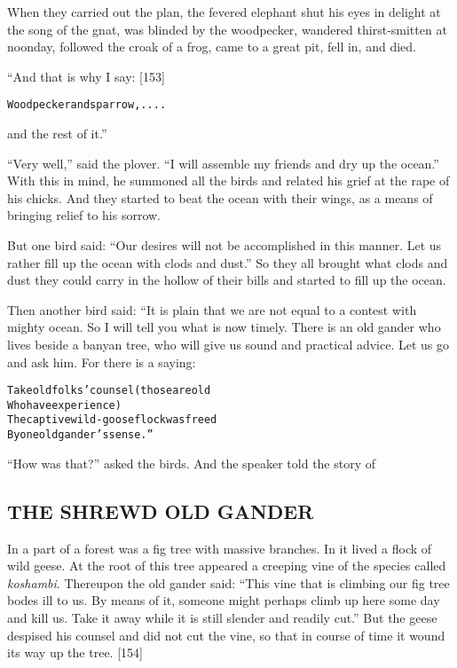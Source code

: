 \documentclass{article}
\renewenvironment{verbatim}{\begin{alltt}\normalfont\begin{centering}}{\end{centering}\end{alltt}}
\begin{document}
When they carried out the plan, the fevered elephant shut his eyes
in delight at the song of the gnat, was blinded by the woodpecker,
wandered thirst-smitten at noonday, followed the croak of a frog,
came to a great pit, fell in, and died.

“And that is why I say: [153]

\begin{verbatim}
Woodpecker and sparrow, . . . .
\end{verbatim}
and the rest of it.”

``Very well,'' said the plover.
``I will assemble my friends and dry up the ocean.'' With this in
mind, he summoned all the birds and related his grief at the rape
of his chicks. And they started to beat the ocean with their wings,
as a means of bringing relief to his sorrow.

But one bird said:
``Our desires will not be accomplished in this manner. Let us rather fill up the ocean with clods and dust.''
So they all brought what clods and dust they could carry in the
hollow of their bills and started to fill up the ocean.

Then another bird said: “It is plain that we are not equal to a
contest with mighty ocean. So I will tell you what is now timely.
There is an old gander who lives beside a banyan tree, who will
give us sound and practical advice. Let us go and ask him. For
there is a saying:

\begin{verbatim}
Take old folks' counsel (those are old
    Who have experience)
The captive wild-goose flock was freed
    By one old gander's sense.”
\end{verbatim}
``How was that?'' asked the birds. And the speaker told the story
of

\subsection{THE SHREWD OLD GANDER}

In a part of a forest was a fig tree with massive branches. In it
lived a flock of wild geese. At the root of this tree appeared a
creeping vine of the species called \emph{koshambi}. Thereupon the
old gander said:
``This vine that is climbing our fig tree bodes ill to us. By means of it, someone might perhaps climb up here some day and kill us. Take it away while it is still slender and readily cut.''
But the geese despised his counsel and did not cut the vine, so
that in course of time it wound its way up the tree. [154]
\end{document}
